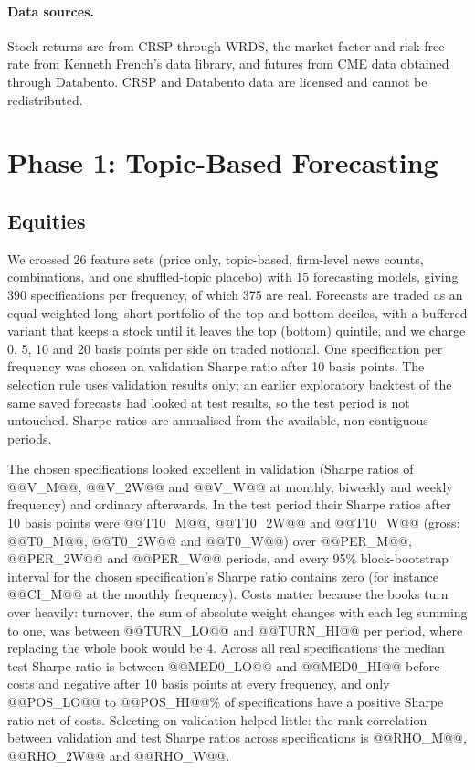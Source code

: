 \documentclass[11pt]{article}
\begin{document}
\paragraph{Data sources.} Stock returns are from CRSP through WRDS, the market factor and risk-free rate from Kenneth French's data library, and futures from CME data obtained through Databento. CRSP and Databento data are licensed and cannot be redistributed.

\section{Phase 1: Topic-Based Forecasting}
\label{sec:phase1}

\subsection{Equities}

We crossed 26 feature sets (price only, topic-based, firm-level news counts, combinations, and one shuffled-topic placebo) with 15 forecasting models, giving 390 specifications per frequency, of which 375 are real. Forecasts are traded as an equal-weighted long--short portfolio of the top and bottom deciles, with a buffered variant that keeps a stock until it leaves the top (bottom) quintile, and we charge 0, 5, 10 and 20 basis points per side on traded notional. One specification per frequency was chosen on validation Sharpe ratio after 10 basis points. The selection rule uses validation results only; an earlier exploratory backtest of the same saved forecasts had looked at test results, so the test period is not untouched. Sharpe ratios are annualised from the available, non-contiguous periods.

The chosen specifications looked excellent in validation (Sharpe ratios of @@V_M@@, @@V_2W@@ and @@V_W@@ at monthly, biweekly and weekly frequency) and ordinary afterwards. In the test period their Sharpe ratios after 10 basis points were @@T10_M@@, @@T10_2W@@ and @@T10_W@@ (gross: @@T0_M@@, @@T0_2W@@ and @@T0_W@@) over @@PER_M@@, @@PER_2W@@ and @@PER_W@@ periods, and every 95\% block-bootstrap interval for the chosen specification's Sharpe ratio contains zero (for instance @@CI_M@@ at the monthly frequency). Costs matter because the books turn over heavily: turnover, the sum of absolute weight changes with each leg summing to one, was between @@TURN_LO@@ and @@TURN_HI@@ per period, where replacing the whole book would be 4. Across all real specifications the median test Sharpe ratio is between @@MED0_LO@@ and @@MED0_HI@@ before costs and negative after 10 basis points at every frequency, and only @@POS_LO@@ to @@POS_HI@@\% of specifications have a positive Sharpe ratio net of costs. Selecting on validation helped little: the rank correlation between validation and test Sharpe ratios across specifications is @@RHO_M@@, @@RHO_2W@@ and @@RHO_W@@.
\end{document}
